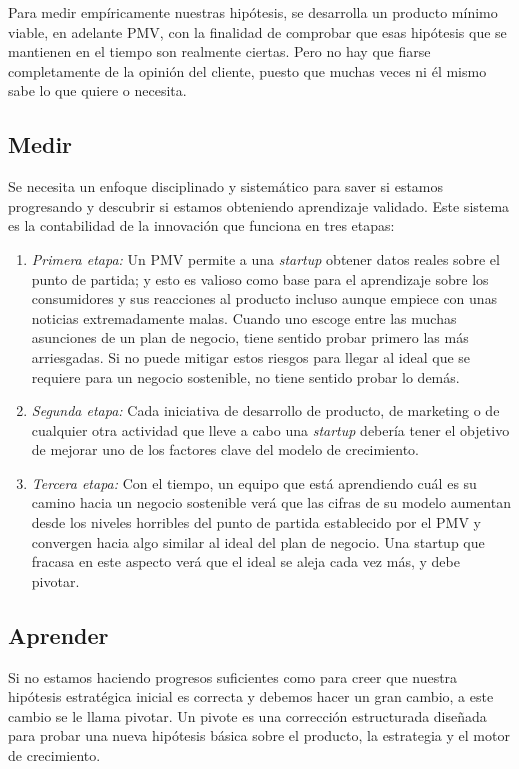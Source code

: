 Para medir empíricamente nuestras hipótesis, se desarrolla un producto mínimo viable, en adelante PMV, con la finalidad de comprobar que esas hipótesis que se mantienen en el tiempo son realmente ciertas. Pero no hay que fiarse completamente de la opinión del cliente, puesto que muchas veces ni él mismo sabe lo que quiere o necesita.


\subsection{Medir}
Se necesita un enfoque disciplinado y sistemático para saver si estamos progresando y descubrir si estamos obteniendo aprendizaje validado. Este sistema es la contabilidad de la innovación que funciona en tres etapas:
\begin{enumerate}
\item \textit{Primera etapa: } Un PMV permite a una \textit{startup} obtener datos reales sobre el punto de partida; y esto es valioso como base para el aprendizaje sobre los consumidores y sus reacciones al producto incluso aunque empiece con unas noticias extremadamente malas. Cuando uno escoge entre las muchas asunciones de un plan de negocio, tiene sentido probar primero las más arriesgadas. Si no puede mitigar estos riesgos para llegar al ideal que se requiere para un negocio sostenible, no tiene sentido probar lo demás.
\item \textit{Segunda etapa: } Cada iniciativa de desarrollo de producto, de marketing o de cualquier otra actividad que lleve a cabo una \textit{startup} debería tener el objetivo de mejorar uno de los factores clave del modelo de crecimiento.
\item \textit{Tercera etapa: } Con el tiempo, un equipo que está aprendiendo cuál es su camino hacia un negocio sostenible verá que las cifras de su modelo aumentan desde los niveles horribles del punto de partida establecido por el PMV y convergen hacia algo similar al ideal del plan de negocio. Una startup que fracasa en este aspecto verá que el ideal se aleja cada vez más, y debe pivotar.
\end{enumerate}


\subsection{Aprender}
Si no estamos haciendo progresos suficientes como para creer que nuestra hipótesis estratégica inicial es correcta y debemos hacer un gran cambio, a este cambio se le llama pivotar. Un pivote es una corrección estructurada diseñada para probar una nueva hipótesis básica sobre el producto, la estrategia y el motor de crecimiento.


